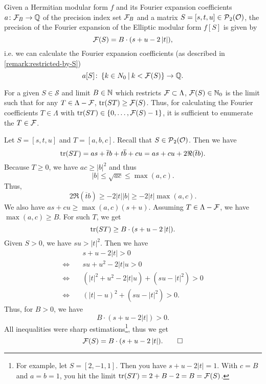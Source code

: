 \begin{lemma}
\label{lemma:fprecisionlimit}
Given a Hermitian modular form $f$ and its Fourier expansion coefficients $a \colon \mathcal{F}_B \rightarrow \mathbb{Q}$ of the precision index set $\mathcal{F}_B$ and a matrix $S = [s,t,u] \in \operatorname{\mathcal{P}}_2(\mathcal{O})$, the precision of the Fourier expansion of the Elliptic modular form $f[S]$ is given by
\[ \mathcal{F}(S) = B \cdot (s + u - 2 \left| t \right|) , \]
i.e. we can calculate the Fourier expansion coefficients (as described in \cref{remark:restricted-by-S})
\[ a[S] \colon \Set{k \in N_0}{k < \FPrecisionLimit{S}} \rightarrow \Q . \]

\proof
For a given $S \in \mathcal{S}$ and limit $B \in \mathbb{N}$ which restricts $\mathcal{F} \subset \Lambda$, $\mathcal{F}(S) \in \mathbb{N}_0$ is the limit such that for any $T \in \Lambda - \mathcal{F}$, $\textup{\textrm{tr}}(S T) \ge \mathcal{F}(S)$. Thus, for calculating the Fourier coefficients $T \in \Lambda$ with $\tr(S T) \in \Set{0, \dots, \FPrecisionLimit{S} - 1}$, it is sufficient to enumerate the $T \in \mathcal{F}$.

Let $S = [s,t,u]$ and $T = [a,b,c]$. Recall that $S \in \operatorname{\mathcal{P}}_2(\mathcal{O})$. Then we have
\[ \textup{\textrm{tr}}(S T) = as + \overline{t} b + t \overline{b} + cu = as + cu + 2 \Re(\overline{t} b) . \]
Because $T \ge 0$, we have $ac \ge \left| b \right|^2$ and thus
\[ \left| b \right| \le \sqrt{ac} \le \max(a,c). \]
Thus,
\[ 2 \Re(\overline{t} b) \ge -2 \left| t \right| \left| b \right| \ge -2 \left| t \right| \max(a,c). \]
We also have $as + cu \ge \max(a,c) (s + u)$. Assuming $T \in \Lambda - \mathcal{F}$, we have $\max(a,c) \ge B$. For such $T$, we get
\[ \textup{\textrm{tr}}(ST) \ge B \cdot (s + u - 2 \left| t \right|) . \]
Given $S > 0$, we have $su > \left| t \right|^2$. Then we have
\begin{align*}
& s + u - 2 \left| t \right| > 0 \\
\Leftrightarrow \quad & su + u^2 - 2 \left| t \right| u > 0 \\
\Leftrightarrow \quad & \left( \left|t\right|^2 + u^2 - 2 \left| t \right| u \right) + (su - \left|t \right|^2) > 0 \\
\Leftrightarrow \quad & \left(\left| t \right| - u \right)^2 + (su - \left| t \right|^2) > 0 .
\end{align*}
Thus, for $B > 0$, we have
\[ B \cdot (s + u - 2 \left| t \right|) > 0 . \]
All inequalities were sharp estimations\footnote{For example, let $S=[2,-1,1]$. Then you have $s+u-2 \left| t \right| = 1$. With $c=B$ and $a=b=1$, you hit the limit $\textup{\textrm{tr}}(S T) = 2 + B - 2 = B = \mathcal{F}(S)$. }, %
thus we get
\[ \mathcal{F}(S) = B \cdot (s + u - 2 \left| t \right|) . \qedhere \]
\endproof
\end{lemma}

